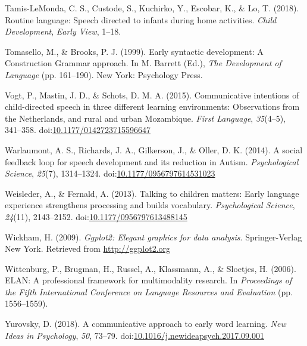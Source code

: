 \documentclass[floatsintext,man]{apa6}
\theoremstyle{definition}
\theoremstyle{definition}
\theoremstyle{definition}
\theoremstyle{remark}
\begin{document}
\hypertarget{ref-tamislemonda2018routine}{}
Tamis-LeMonda, C. S., Custode, S., Kuchirko, Y., Escobar, K., \& Lo, T.
(2018). Routine language: Speech directed to infants during home
activities. \emph{Child Development}, \emph{Early View}, 1--18.

\hypertarget{ref-tomasello1999early}{}
Tomasello, M., \& Brooks, P. J. (1999). Early syntactic development: A
Construction Grammar approach. In M. Barrett (Ed.), \emph{The
Development of Language} (pp. 161--190). New York: Psychology Press.

\hypertarget{ref-vogt2015communicative}{}
Vogt, P., Mastin, J. D., \& Schots, D. M. A. (2015). Communicative
intentions of child-directed speech in three different learning
environments: Observations from the Netherlands, and rural and urban
Mozambique. \emph{First Language}, \emph{35}(4--5), 341--358.
doi:\href{https://doi.org/10.1177/0142723715596647}{10.1177/0142723715596647}

\hypertarget{ref-warlaumont2014social}{}
Warlaumont, A. S., Richards, J. A., Gilkerson, J., \& Oller, D. K.
(2014). A social feedback loop for speech development and its reduction
in Autism. \emph{Psychological Science}, \emph{25}(7), 1314--1324.
doi:\href{https://doi.org/10.1177/0956797614531023}{10.1177/0956797614531023}

\hypertarget{ref-weisleder2013talking}{}
Weisleder, A., \& Fernald, A. (2013). Talking to children matters: Early
language experience strengthens processing and builds vocabulary.
\emph{Psychological Science}, \emph{24}(11), 2143--2152.
doi:\href{https://doi.org/10.1177/0956797613488145}{10.1177/0956797613488145}

\hypertarget{ref-R-ggplot2}{}
Wickham, H. (2009). \emph{Ggplot2: Elegant graphics for data analysis}.
Springer-Verlag New York. Retrieved from \url{http://ggplot2.org}

\hypertarget{ref-ELAN}{}
Wittenburg, P., Brugman, H., Russel, A., Klassmann, A., \& Sloetjes, H.
(2006). ELAN: A professional framework for multimodality research. In
\emph{Proceedings of the Fifth International Conference on Language
Resources and Evaluation} (pp. 1556--1559).

\hypertarget{ref-yurovsky2018communicative}{}
Yurovsky, D. (2018). A communicative approach to early word learning.
\emph{New Ideas in Psychology}, \emph{50}, 73--79.
doi:\href{https://doi.org/10.1016/j.newideapsych.2017.09.001}{10.1016/j.newideapsych.2017.09.001}

\endgroup
\end{document}
